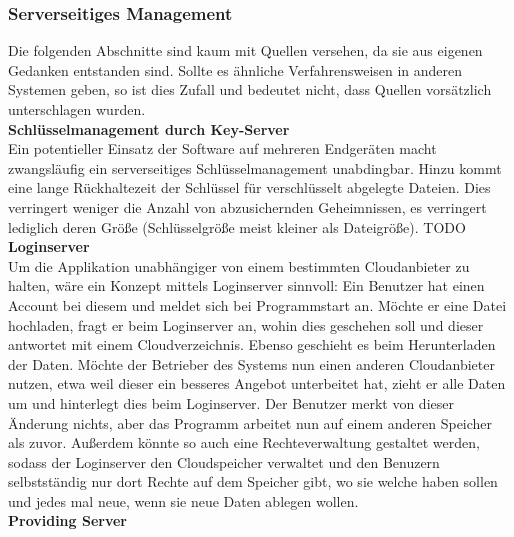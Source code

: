 \documentclass[12pt,a4paper,bibliography=totocnumbered,listof=totocnumbered]{scrartcl}
\begin{document}
\subsubsection{Serverseitiges Management}
Die folgenden Abschnitte sind kaum mit Quellen versehen, da sie aus eigenen Gedanken entstanden sind. Sollte es ähnliche Verfahrensweisen in anderen Systemen geben, so ist dies Zufall und bedeutet nicht, dass Quellen vorsätzlich unterschlagen wurden.\\
\textbf{Schlüsselmanagement durch Key-Server}\\
Ein potentieller Einsatz der Software auf mehreren Endgeräten macht zwangsläufig ein serverseitiges Schlüsselmanagement unabdingbar. Hinzu kommt eine lange Rückhaltezeit der Schlüssel für verschlüsselt abgelegte Dateien. Dies verringert weniger die Anzahl von abzusichernden Geheimnissen, es verringert lediglich deren Größe (Schlüsselgröße meist kleiner als Dateigröße). TODO \cite{38}
\\\textbf{Loginserver}\\
Um die Applikation unabhängiger von einem bestimmten Cloudanbieter zu halten, wäre ein Konzept mittels Loginserver sinnvoll: Ein Benutzer hat einen Account bei diesem und meldet sich bei Programmstart an. Möchte er eine Datei hochladen, fragt er beim Loginserver an, wohin dies geschehen soll und dieser antwortet mit einem Cloudverzeichnis. Ebenso geschieht es beim Herunterladen der Daten. Möchte der Betrieber des Systems nun einen anderen Cloudanbieter nutzen, etwa weil dieser ein besseres Angebot unterbeitet hat, zieht er alle Daten um und hinterlegt dies beim Loginserver. Der Benutzer merkt von dieser Änderung nichts, aber das Programm arbeitet nun auf einem anderen Speicher als zuvor. Außerdem könnte so auch eine Rechteverwaltung gestaltet werden, sodass der Loginserver den Cloudspeicher verwaltet und den Benuzern selbstständig nur dort Rechte auf dem Speicher gibt, wo sie welche haben sollen und jedes mal neue, wenn sie neue Daten ablegen wollen.
\\\textbf{Providing Server}\label{provV}\\
\end{document}

